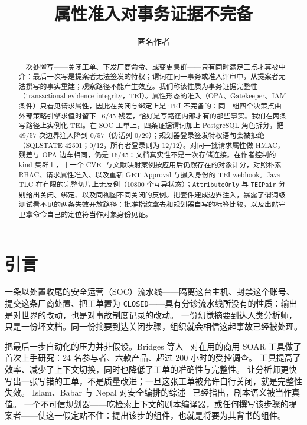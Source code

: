 \documentclass[acmsmall,manuscript,review,anonymous]{acmart}
\title[属性准入对事务证据不完备]{属性准入对事务证据不完备}
\author{匿名作者}
\affiliation{%
  \institution{匿名机构}
  \country{}}
\renewcommand{\_}{\discretionary{\textunderscore}{}{\textunderscore}}
\begin{document}
\begin{abstract}
一次处置写——关闭工单、下发厂商命令、或变更集群——只有同时满足三点才算被中介：最后一次写是提案者无法签发的特权；谓词在同一事务或准入评审中，从提案者无法撰写的事实重建；观察路径不能产生效应。我们称该性质为事务证据完整性（transactional evidence integrity，{TEI}）。属性形态的准入（{OPA}、Gatekeeper、{IAM} 条件）只看见请求属性，因此在关闭与绑定上是 {TEI}-不完备的：同一组四个决策点由外部策略引擎求值时留下 16/45 残差，恰好是写路径内部才有的那些事实。我们在两条写路径上实例化 {TEI}。在 {SOC} 工单上，四条证据谓词加上 {PostgreSQL} 角色拆分，把 49/57 次边界注入降到 0/57（伪活列 0/29）；规划器登录签发特权语句会被拒绝（{SQLSTATE} 42501；0/12，所有者登录则为 12/12）。对同一批请求属性做 {HMAC}，残差与 {OPA} 边车相同，仍是 16/45：文档真实性不是一次存储连接。在作者控制的 kind 集群上，十一个 {CVE}- 与文献映射案例按应用后仍然存在的对象计分，对照朴素 {RBAC}、请求属性准入、以及重新 {GET} Approval 与摄入身份的 {TEI} webhook。Java {TLC} 在有限的完整切片上无反例（10800 个互异状态）；\texttt{AttributeOnly} 与 \texttt{TEIPair} 分别给出关闭、绑定、以及同视图不同关闭的反例。把套件建成边界注入，暴露了谓词级测试看不见的两条失效开放路径：批准指纹拿去和规划器自写的标签比较，以及出站守卫拿命令自己的定位符当作对象身份见证。
\end{abstract}

\maketitle

\section{引言}
\label{sec:intro}

一条以处置收尾的安全运营（SOC）流水线——隔离这台主机、封禁这个账号、提交这条厂商处置、把工单置为
\texttt{CLOSED}——具有分诊流水线所没有的性质：输出是对世界的改动，也是对事故制度记录的改动。
一份幻觉摘要到达人类分析师，只是一份坏文档。同一份摘要到达关闭步骤，组织就会相信这起事故已经被处理。

把最后一步自动化的压力并非假设。Bridges
等人~\cite{bridges2023testing} 对在用的商用 {SOAR} 工具做了首次上手研究：24 名参与者、六款产品、超过 200 小时的受控调查。
工具提高了效率、减少了上下文切换，同时也降低了工单的准确性与完整性。
让分析师更快写出一张写错的工单，不是质量改进；一旦这张工单被允许自行关闭，就是完整性失效。
Islam、Babar 与 Nepal 对安全编排的综述~\cite{islam2019orchestration} 已经指出，剧本语义被当作真值。
一个不可信规划器——吃检索上下文的剧本编译器，或任何撰写该步骤的提案者——使这一假定站不住：提出该步的组件，也就是将要为其背书的组件。
\end{document}
